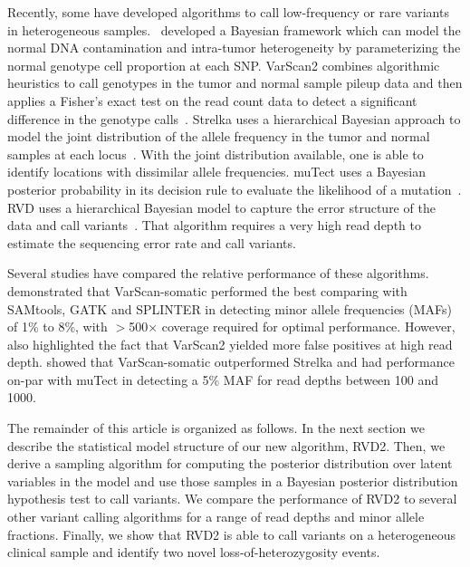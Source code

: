 \documentclass{bioinfo}
\begin{document}
Recently, some have developed algorithms to call low-frequency or rare variants in heterogeneous samples.~\citet{yau2010statistical} developed a Bayesian framework which can model the normal DNA contamination and intra-tumor heterogeneity by parameterizing the normal genotype cell proportion at each SNP. VarScan2 combines algorithmic heuristics to call genotypes in the tumor and normal sample pileup data and then applies a Fisher's exact test on the read count data to detect a significant difference in the genotype calls~\citep{Koboldt:2012cg}. Strelka uses a hierarchical Bayesian approach to model the joint distribution of the allele frequency in the tumor and normal samples at each locus~\citep{Saunders:2012fh}. With the joint distribution available, one is able to identify locations with dissimilar allele frequencies. muTect uses a Bayesian posterior probability in its decision rule to evaluate the likelihood of a mutation~\citep{Cibulskis:2013ta}. RVD uses a hierarchical Bayesian model to capture the error structure of the data and call variants~\citep{Flaherty:2011ja, cushing2013rvd}. That algorithm requires a very high read depth to estimate the sequencing error rate and call variants.

Several studies have compared the relative performance of these algorithms. \citet{spencer2013performance} demonstrated  that VarScan-somatic performed the best comparing with SAMtools, GATK and SPLINTER in detecting minor allele frequencies (MAFs) of 1\% to 8\%, with $ > $500× coverage required for optimal performance. However, \citet{spencer2013performance} also highlighted the fact that VarScan2 yielded more false positives at high read depth. \citet{Stead:2013fu} showed that VarScan-somatic outperformed Strelka and had performance on-par with muTect in detecting a 5\% MAF for read depths between 100 and 1000. %

The remainder of this article is organized as follows. In the next section we describe the statistical model structure of our new algorithm, RVD2. Then, we derive a sampling algorithm for computing the posterior distribution over latent variables in the model and use those samples in a Bayesian posterior distribution hypothesis test to call variants. We compare the performance of RVD2 to several other variant calling algorithms for a range of read depths and minor allele fractions. Finally, we show that RVD2 is able to call variants on a heterogeneous clinical sample and identify two novel loss-of-heterozygosity events.
\end{document}
